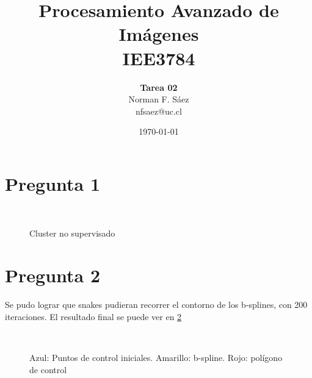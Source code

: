 \documentclass[a4paper,10pt]{article}
\title{Procesamiento Avanzado de Imágenes\\IEE3784}
\author{\textbf{Tarea 02}\\Norman F. Sáez\\nfsaez@uc.cl}
\date{\today}
\begin{document}
\maketitle
\section{Pregunta 1}
\begin{figure}[ht!]
  \centering
  ~ 
  \caption{Cluster no supervisado}
  \label{fig:p1}
\end{figure}

\section{Pregunta 2}
Se pudo lograr que snakes pudieran recorrer el contorno de los b-splines, con 200 iteraciones. El resultado final se puede ver en \ref{fig:p2}
\begin{figure}[ht!]
  \centering
  ~ 
  \caption{Azul: Puntos de control iniciales. Amarillo: b-spline.  Rojo: polígono de control}
  \label{fig:p2}
\end{figure}
\end{document}
